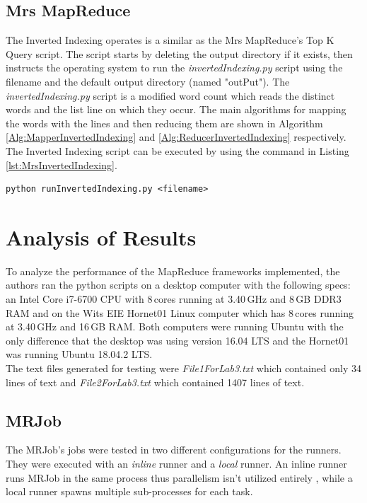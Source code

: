 \documentclass[10pt, twocolumn]{article}
\begin{document}
\subsection{Mrs MapReduce}
%
The Inverted Indexing operates is a similar as the Mrs MapReduce's Top K Query script. The script starts by deleting the output directory if it exists, then instructs the operating system to run the \emph{invertedIndexing.py} script using the filename and the default output directory (named "outPut"). The \emph{invertedIndexing.py} script is a modified word count which reads the distinct words and the list line on which they occur. The main algorithms for mapping the words with the lines and then reducing them  are shown in Algorithm \ref*{Alg:MapperInvertedIndexing} and \ref*{Alg:ReducerInvertedIndexing} respectively. The Inverted Indexing script can be executed by using the command in Listing \ref*{lst:MrsInvertedIndexing}.
%
\begin{center}
\begin{minipage}{0.99\columnwidth}
\begin{lstlisting}[style=bashStyle, label=lst:MrsInvertedIndexing, caption = Command to execute Inverted Indexing (Mrs)]
python runInvertedIndexing.py <filename>
\end{lstlisting}
\end{minipage}
\end{center}
%
\section{Analysis of Results}
To analyze the performance of the MapReduce frameworks implemented, the authors ran the python scripts on a desktop computer with the following specs: an Intel Core i7-6700 CPU with 8\,cores running at 3.40\,GHz and 8\,GB DDR3\,RAM and on the Wits EIE Hornet01 Linux computer which has 8\,cores running at 3.40\,GHz and 16\,GB RAM. Both computers were running Ubuntu with the only difference that the desktop was using version 16.04 LTS and the Hornet01 was running Ubuntu 18.04.2 LTS.\\

\noindent The text files generated for testing were \emph{File1ForLab3.txt} which contained only 34 lines of text and \emph{File2ForLab3.txt} which contained 1407 lines of text. 
%
\subsection{MRJob}
%
The MRJob's jobs were tested in two different configurations for the runners. They were executed with an \emph{inline} runner and a \emph{local} runner. An inline runner runs MRJob in the same process thus parallelism isn't utilized entirely \cite{ELEN4020A_REF:MRJobLocalRunner}, while a local runner spawns multiple sub-processes for each task\cite{ELEN4020A_REF:MRJobInlineRunner}. \\
\end{document}
